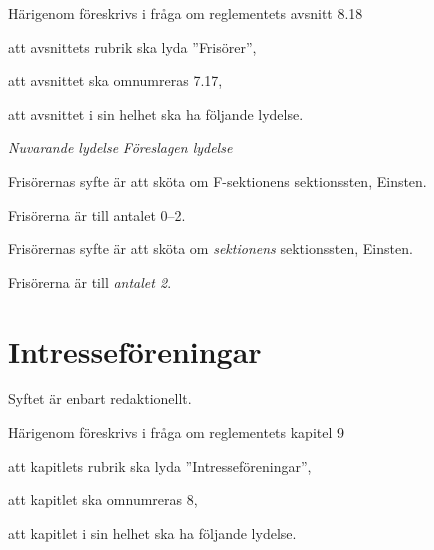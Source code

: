 \documentclass{article}
\newenvironment{lydelse}
    {\begin{paracol}{2}%
        \emph{Nuvarande lydelse}%
        \switchcolumn%
        \emph{Föreslagen lydelse}%
    \end{paracol}%
    \begin{enumerate}[label=\thesubsection.\arabic*]%
    \begin{paracol}{2}%
    }{\end{paracol}\end{enumerate}}
\begin{document}
Härigenom föreskrivs i fråga om reglementets avsnitt 8.18

\begin{dels}
    \item att avsnittets rubrik ska lyda ''Frisörer'',
    \item att avsnittet ska omnumreras 7.17,
    \item att avsnittet i sin helhet ska ha följande lydelse.
\end{dels}
\begin{lydelse}
    \setcounter{section}{8}
    \setcounter{subsection}{18}
    
    \item Frisörernas syfte är att sköta om F-sektionens sektionssten, Einsten.
        
    \item Frisörerna är till antalet 0--2.
    
    \setcounter{section}{7}
    \setcounter{subsection}{17}
    \switchcolumn
    
    \item Frisörernas syfte är att sköta om \emph{sektionens} sektionssten, Einsten.
        
    \item Frisörerna är till \emph{antalet 2}.
    
\end{lydelse}

\section{Intresseföreningar}
Syftet är enbart redaktionellt.

Härigenom föreskrivs i fråga om reglementets kapitel 9

\begin{dels}
    \item att kapitlets rubrik ska lyda ''Intresseföreningar'',
    \item att kapitlet ska omnumreras 8,
    \item att kapitlet i sin helhet ska ha följande lydelse.
\end{dels}
\end{document}
